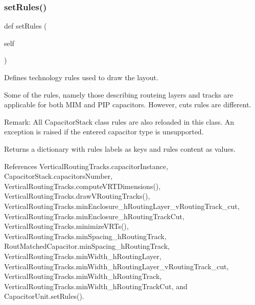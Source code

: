 \subsubsection{\texorpdfstring{set\+Rules()}{setRules()}}
{\footnotesize\ttfamily def set\+Rules (\begin{DoxyParamCaption}\item[{}]{self }\end{DoxyParamCaption})}



Defines technology rules used to draw the layout. 

Some of the rules, namely those describing routeing layers and tracks are applicable for both M\+IM and P\+IP capacitors. However, cuts rules are different. \begin{DoxyParagraph}{Remark\+: All {\ttfamily Capacitor\+Stack} class rules are also reloaded in this class. An exception is raised if the entered capacitor type is unsupported. }

\end{DoxyParagraph}
\begin{DoxyReturn}{Returns}
a dictionary with rules labels as keys and rules content as values. 
\end{DoxyReturn}


References Vertical\+Routing\+Tracks.\+capacitor\+Instance, Capacitor\+Stack.\+capacitors\+Number, Vertical\+Routing\+Tracks.\+compute\+V\+R\+T\+Dimensions(), Vertical\+Routing\+Tracks.\+draw\+V\+Routing\+Tracks(), Vertical\+Routing\+Tracks.\+min\+Enclosure\+\_\+h\+Routing\+Layer\+\_\+v\+Routing\+Track\+\_\+cut, Vertical\+Routing\+Tracks.\+min\+Enclosure\+\_\+h\+Routing\+Track\+Cut, Vertical\+Routing\+Tracks.\+minimize\+V\+R\+Ts(), Vertical\+Routing\+Tracks.\+min\+Spacing\+\_\+h\+Routing\+Track, Rout\+Matched\+Capacitor.\+min\+Spacing\+\_\+h\+Routing\+Track, Vertical\+Routing\+Tracks.\+min\+Width\+\_\+h\+Routing\+Layer, Vertical\+Routing\+Tracks.\+min\+Width\+\_\+h\+Routing\+Layer\+\_\+v\+Routing\+Track\+\_\+cut, Vertical\+Routing\+Tracks.\+min\+Width\+\_\+h\+Routing\+Track, Vertical\+Routing\+Tracks.\+min\+Width\+\_\+h\+Routing\+Track\+Cut, and Capacitor\+Unit.\+set\+Rules().

\mbox{\label{classpython_1_1capacitorvrtracks_1_1VerticalRoutingTracks_ade479990eba75cc3c94fba25082a4b28}} 
